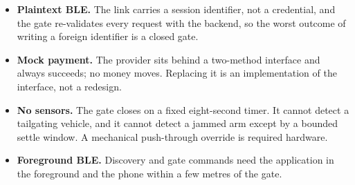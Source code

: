 \begin{itemize}
  \item \textbf{Plaintext BLE.} The link carries a session identifier, not a
        credential, and the gate re-validates every request with the backend, so
        the worst outcome of writing a foreign identifier is a closed gate.
  \item \textbf{Mock payment.} The provider sits behind a two-method interface and
        always succeeds; no money moves. Replacing it is an implementation of the
        interface, not a redesign.
  \item \textbf{No sensors.} The gate closes on a fixed eight-second timer. It
        cannot detect a tailgating vehicle, and it cannot detect a jammed arm except
        by a bounded settle window. A mechanical push-through override is required
        hardware.
  \item \textbf{Foreground BLE.} Discovery and gate commands need the application in
        the foreground and the phone within a few metres of the gate.
\end{itemize}
